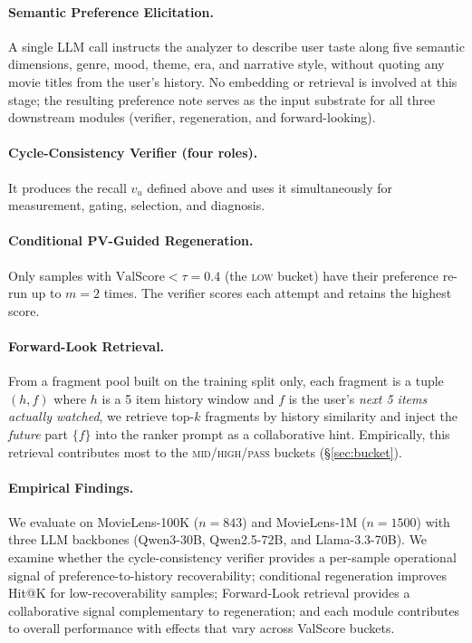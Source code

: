 \documentclass[11pt]{article}
\begin{document}
\paragraph{Semantic Preference Elicitation.} A single LLM call instructs the analyzer to describe user taste along five semantic dimensions, genre, mood, theme, era, and narrative style, without quoting any movie titles from the user's history. No embedding or retrieval is involved at this stage; the resulting preference note serves as the input substrate for all three downstream modules (verifier, regeneration, and forward-looking).

\paragraph{Cycle-Consistency Verifier (four roles).} It produces the recall $v_u$ defined above and uses it simultaneously for measurement, gating, selection, and diagnosis.

\paragraph{Conditional PV-Guided Regeneration.} Only samples with $\mathrm{ValScore} < \tau{=}0.4$ (the \textsc{low} bucket) have their preference re-run up to $m{=}2$ times. The verifier scores each attempt and retains the highest score.

\paragraph{Forward-Look Retrieval.} From a fragment pool built on the training split only, each fragment is a tuple $(h, f)$ where $h$ is a 5 item history window and $f$ is the user's \emph{next 5 items actually watched}, we retrieve top-$k$ fragments by history similarity and inject the \emph{future} part $\{f\}$ into the ranker prompt as a collaborative hint. Empirically, this retrieval contributes most to the \textsc{mid}/\textsc{high}/\textsc{pass} buckets (\S\ref{sec:bucket}).

\paragraph{Empirical Findings.}
We evaluate on MovieLens-100K ($n{=}843$) and MovieLens-1M ($n{=}1500$) with three LLM backbones (Qwen3-30B, Qwen2.5-72B, and Llama-3.3-70B). We examine whether the cycle-consistency verifier provides a per-sample operational signal of preference-to-history recoverability; conditional regeneration improves Hit@K for low-recoverability samples; Forward-Look retrieval provides a collaborative signal complementary to regeneration; and each module contributes to overall performance with effects that vary across ValScore buckets.
\end{document}
